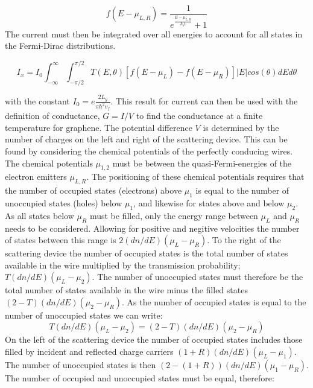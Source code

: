 \documentclass[prl,twocolumn,aps,superscriptaddress,floatfix,10pt]{revtex4}
\begin{document}
			\begin{equation}
				f\left(E-\mu_{L,R}\right)=\frac{1}{e^{\frac{E-\mu_{L,R}}{k_{b}t}}+1}
			\end{equation}
			The current must then be integrated over all energies to account for all states in the Fermi-Dirac distributions.
			\begin{widetext}
			\begin{equation}
				I_{x}=I_{0}\int^{\infty}_{-\infty}\int^{\pi/2}_{-\pi/2}T\left(E,\theta\right)\left[f\left(E-\mu_{L}\right)-f\left(E-\mu_{R}\right)\right]|E|cos\left(\theta\right)dEd\theta
			\end{equation}
			\end{widetext}
			with the constant $I_{0}=e\frac{2L_{y}}{\pi\hbar^{2}v_{f}}$. This result for current can then be used with the definition of conductance, $G=I/V$ to find the conductance at a finite temperature for graphene. The potential difference $V$ is determined by the number of charges on the left and right of the scattering device. This can be found by considering the chemical potentials of the perfectly conducing wires. The chemical potentials $\mu_{1,2}$ must be between the quasi-Fermi-energies of the electron emitters $\mu_{L,R}$. The positioning of these chemical potentials requires that the number of occupied states (electrons) above $\mu_{1}$ is equal to the number of unoccupied states (holes) below $\mu_{1}$, and likewise for states above and below $\mu_{2}$. As all states below $\mu_{R}$ must be filled, only the energy range between $\mu_{L}$ and $\mu_{R}$ needs to be considered. Allowing for positive and negitive velocities the number of states between this range is $2\left(dn/dE\right)\left(\mu_{L}-\mu_{R}\right)$. To the right of the scattering device the number of occupied states is the total number of states available in the wire multiplied by the transmission probability; $T\left(dn/dE\right)\left(\mu_{L}-\mu_{2}\right)$. The number of unoccupied states must therefore be the total number of states available in the wire minus the filled states $\left(2-T\right)\left(dn/dE\right)\left(\mu_{2}-\mu_{R}\right)$. As the number of occupied states is equal to the number of unoccupied states we can write:
			\begin{equation}
				T\left(dn/dE\right)\left(\mu_{L}-\mu_{2}\right)=\left(2-T\right)\left(dn/dE\right)\left(\mu_{2}-\mu_{R}\right)
				\label{mu-2}
			\end{equation}
			On the left of the scattering device the number of occupied states includes those filled by incident and reflected charge carriers $\left(1+R\right)\left(dn/dE\right)\left(\mu_{L}-\mu_{1}\right)$. The number of unoccupied states is then $\left(2-\left(1+R\right)\right)\left(dn/dE\right)\left(\mu_{1}-\mu_{R}\right)$. The number of occupied and unoccupied states must be equal, therefore:
\end{document}
